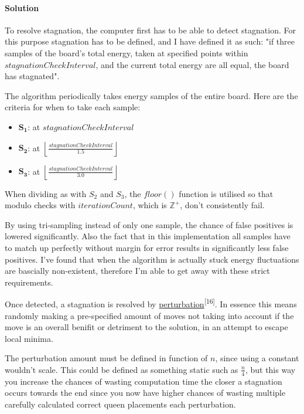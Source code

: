 \documentclass{article}
\begin{document}
\paragraph{Solution}
To resolve stagnation, the computer first has to be able to detect stagnation. For this purpose stagnation has to be defined, and I have defined it as such:
"if three samples of the board's total energy, taken at specified points within $stagnationCheckInterval$,
and the current total energy are all equal, the board has stagnated".

The algorithm periodically takes energy samples of the entire board.
Here are the criteria for when to take each sample:

\begin{itemize}

    \item \(\mathbf{S_1}\): at \(stagnationCheckInterval\)
    \item \(\mathbf{S_2}\): at \( \left\lfloor \frac{stagnationCheckInterval}{1.5} \right\rfloor\)
    \item \(\mathbf{S_3}\): at \( \left\lfloor \frac{stagnationCheckInterval}{3.0} \right\rfloor\)
\end{itemize}

When dividing as with $S_2$ and $S_3$, the $floor()$ function is utilised so that modulo checks with
\newline $iterationCount$, which is $\mathbb{Z}^+$, don't consistently fail.

By using tri-sampling instead of only one sample, the chance of false positives is lowered significantly.
Also the fact that in this implementation all samples have to match up perfectly without margin for error results in significantly less false positives.
I've found that when the algorithm is actually stuck energy fluctuations are bascially non-existent, therefore I'm able to get away with these strict requirements.

Once detected, a stagnation is resolved by \href{https://en.wikipedia.org/wiki/Perturbation_theory}{perturbation}\textsuperscript{[16]}.
In essence this means randomly making a pre-specified amount of moves not taking into account if the move is an overall benifit or detriment to the solution,
in an attempt to escape local minima.

The perturbation amount must be defined in function of $n$, since using a constant wouldn't scale.
This could be defined as something static such as $\frac{n}{4}$,
but this way you increase the chances of wasting computation time the closer a stagnation occurs towards the end
since you now have higher chances of wasting multiple carefully calculated correct queen placements each perturbation.
\end{document}
